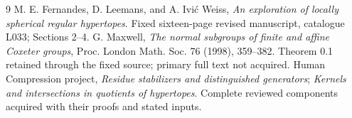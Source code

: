 \documentclass[11pt,a4paper]{article}
\begin{document}
\begin{thebibliography}{9}
 M. E. Fernandes, D. Leemans, and A. Ivi\'c Weiss,
\emph{An exploration of locally spherical regular hypertopes}.
Fixed sixteen-page revised manuscript, catalogue L033; Sections 2--4.
 G. Maxwell, \emph{The normal subgroups of finite and affine
Coxeter groups}, Proc. London Math. Soc. 76 (1998), 359--382.
Theorem 0.1 retained through the fixed source; primary full text not acquired.
 Human Compression project,
\emph{Residue stabilizers and distinguished generators};
\emph{Kernels and intersections in quotients of hypertopes}.
Complete reviewed components acquired with their proofs and stated inputs.
\end{thebibliography}
\end{document}
